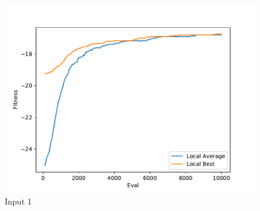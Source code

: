 \documentclass{standalone}
\begin{document}
\begin{figure}[!htb]
	\caption{Input 1}
	\label{fig:graph_1050}
	\includegraphics[width=\textwidth]{../graphs/graphs/1050.pdf}
\end{figure}
\end{document}
